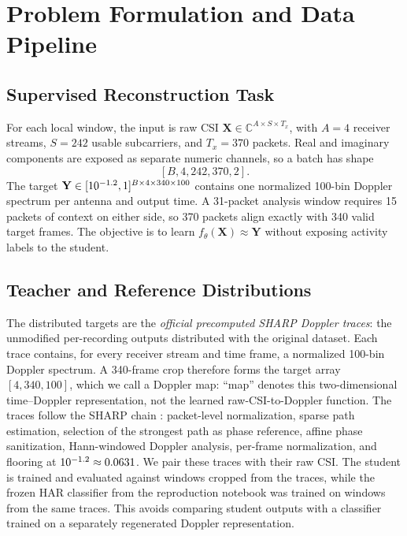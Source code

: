 \section{Problem Formulation and Data Pipeline}
\label{sec:problem}

\subsection{Supervised Reconstruction Task}

For each local window, the input is raw CSI
\(\mathbf{X}\in\mathbb{C}^{A\times S\times T_x}\), with \(A=4\) receiver
streams, \(S=242\) usable subcarriers, and \(T_x=370\) packets. Real and
imaginary components are exposed as separate numeric channels, so a batch has
shape
\[
    [B,4,242,370,2].
\]
The target \(\mathbf{Y}\in[10^{-1.2},1]^{B\times4\times340\times100}\)
contains one normalized 100-bin Doppler spectrum per antenna and output time.
A 31-packet analysis window requires 15 packets of context on either side, so
370 packets align exactly with 340 valid target frames. The objective is to
learn \(f_\theta(\mathbf{X})\approx\mathbf{Y}\) without exposing activity
labels to the student.

\subsection{Teacher and Reference Distributions}

The distributed targets are the \emph{official precomputed SHARP Doppler
traces}: the unmodified per-recording outputs distributed with the original
dataset. Each trace contains, for every receiver stream and time frame, a
normalized 100-bin Doppler spectrum. A 340-frame crop therefore forms the
target array \([4,340,100]\), which we call a Doppler map: ``map'' denotes this
two-dimensional time--Doppler representation, not the learned
raw-CSI-to-Doppler function. The traces follow the SHARP chain
\cite{meneghello2023sharp}: packet-level normalization, sparse path estimation,
selection of the strongest path as phase reference, affine phase sanitization,
Hann-windowed Doppler analysis, per-frame normalization, and flooring at
\(10^{-1.2}\approx0.0631\). We pair these traces with their raw CSI. The student
is trained and evaluated against windows cropped from the traces, while the
frozen HAR classifier from the reproduction notebook was trained on windows
from the same traces. This avoids comparing student outputs with a classifier
trained on a separately regenerated Doppler representation.


